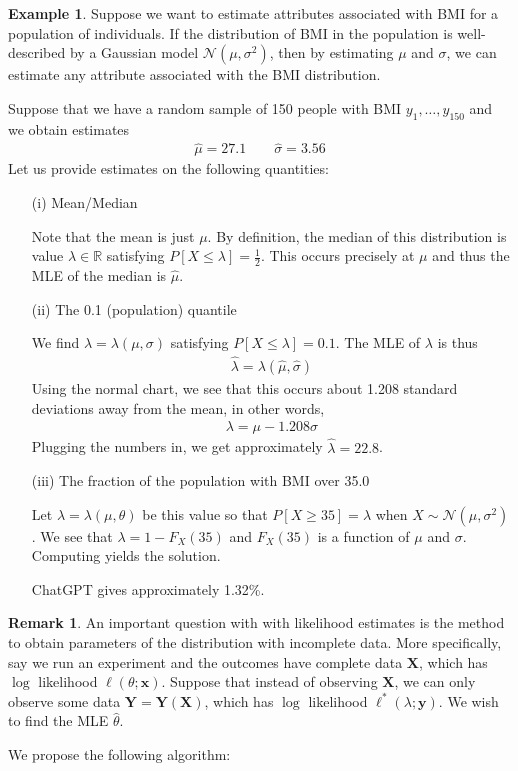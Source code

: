 \documentclass[11pt]{amsart}
\theoremstyle{definition}
\newtheorem{remark}[theorem]{Remark}
\newtheorem{example}[theorem]{Example}
\numberwithin{equation}{section}
\begin{document}
\begin{example}
    Suppose we want to estimate attributes associated with BMI for a population of individuals. If the distribution of BMI in the population is well-described by a Gaussian model $\mathcal N(\mu,\sigma^2)$, then by estimating $\mu$ and $\sigma$, we can estimate any attribute associated with the BMI distribution.

    Suppose that we have a random sample of 150 people with BMI $y_1,\ldots,y_{150}$ and we obtain estimates
    \begin{align*}
        \hat\mu=27.1\qquad\hat\sigma=3.56
    \end{align*}
    Let us provide estimates on the following quantities:
    \begin{enumerate}
        \item [(i)] Mean/Median

        Note that the mean is just $\mu$. By definition, the median of this distribution is value $\lambda\in\mathbb R$ satisfying $P[X\le\lambda]=\frac{1}{2}$. This occurs precisely at $\mu$ and thus the MLE of the median is $\hat\mu$.
        \item [(ii)] The 0.1 (population) quantile

        We find $\lambda=\lambda(\mu,\sigma)$ satisfying $P[X\le\lambda]=0.1$. The MLE of $\lambda$ is thus 
        \begin{align*}
            \hat\lambda=\lambda(\hat\mu,\hat\sigma)
        \end{align*}
        Using the normal chart, we see that this occurs about 1.208 standard deviations away from the mean, in other words,
        \begin{align*}
            \lambda=\mu-1.208\sigma
        \end{align*}
        Plugging the numbers in, we get approximately $\hat\lambda=22.8$.
        \item [(iii)] The fraction of the population with BMI over 35.0

        Let $\lambda=\lambda(\mu,\theta)$ be this value so that $P[X\ge35]=\lambda$ when $X\sim\mathcal N(\mu,\sigma^2)$. We see that $\lambda=1-F_X(35)$ and $F_X(35)$ is a function of $\mu$ and $\sigma$. Computing yields the solution.

        ChatGPT gives approximately 1.32\%.
    \end{enumerate}
    
\end{example}
\begin{remark}
        An important question with with likelihood estimates is the method to obtain parameters of the distribution with incomplete data. More specifically, say we run an experiment and the outcomes have complete data $\mathbf X$, which has $\log$ likelihood $\ell(\theta;\mathbf x)$. Suppose that instead of observing $\mathbf X$, we can only observe some data $\mathbf Y=\mathbf Y(\mathbf X)$, which has $\log$ likelihood $\ell^*(\lambda;\mathbf y)$. We wish to find the MLE $\hat\theta$.

        We propose the following algorithm:
\end{remark}
\end{document}
